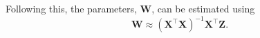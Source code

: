 \documentclass[10pt,a4paper]{article}
\begin{document}
Following this, the parameters, $ \mathbf W$, can be estimated using
\begin{equation}
	\mathbf W\approx(\mathbf X^\top\mathbf X)^{-1}\mathbf X^\top\mathbf Z. 
\end{equation}

\end{document}
